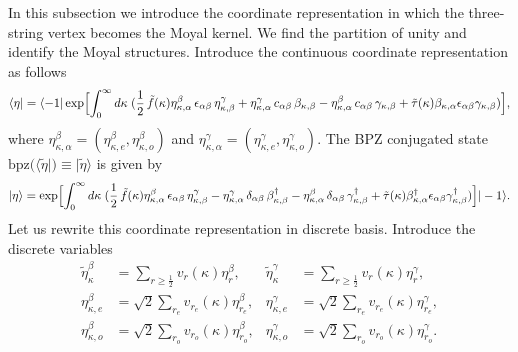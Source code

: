 \documentclass[a4paper,12pt]{article}
\begin{document}
In this subsection we introduce the coordinate
representation in which the three-string vertex
becomes the Moyal kernel.
We find the partition of unity and identify
the Moyal structures.
Introduce the continuous coordinate representation as follows
\begin{gather}
\langle \eta|=\langle-1|
\exp\Bigl[\int_{0}^{\infty}d\kappa\;
(\frac12\,\tilde{f}(\kappa)\eta^{\beta}_{\kappa,\alpha}
\,\epsilon_{\alpha\beta}\,\eta^{\gamma}_{\kappa,\beta}
+\eta^{\gamma}_{\kappa,\alpha}
\,c_{\alpha\beta}\,\beta_{\kappa,\beta}
-\eta^{\beta}_{\kappa,\alpha}
\,c_{\alpha\beta}\,\gamma_{\kappa,\beta}
+\tilde{\tau}(\kappa)
\beta_{\kappa,\alpha}\epsilon_{\alpha\beta}
\gamma_{\kappa,\beta})\Bigr],
\end{gather}
where $\eta^{\beta}_{\kappa,\alpha}
=(\eta^{\beta}_{\kappa,e},\eta^{\beta}_{\kappa,o})$
and $\eta^{\gamma}_{\kappa,\alpha}
=(\eta^{\gamma}_{\kappa,e},\eta^{\gamma}_{\kappa,o})$.
The BPZ conjugated state
$\text{bpz}(\langle\tilde{\eta}|)\equiv|\tilde{\eta}\rangle$ is given by
\begin{gather}
|\eta\rangle=
\exp\Bigl[\int_{0}^{\infty}d\kappa\;
(\frac12\,\tilde{f}(\kappa)\eta^{\beta}_{\kappa,\alpha}
\,\epsilon_{\alpha\beta}\,\eta^{\gamma}_{\kappa,\beta}
-\eta^{\gamma}_{\kappa,\alpha}
\,\delta_{\alpha\beta}\,\beta^{\dag}_{\kappa,\beta}
-\eta^{\beta}_{\kappa,\alpha}
\,\delta_{\alpha\beta}\,\gamma^{\dag}_{\kappa,\beta}
+\tilde{\tau}(\kappa)
\beta^{\dag}_{\kappa,\alpha}\epsilon_{\alpha\beta}
\gamma^{\dag}_{\kappa,\beta})\Bigr]|-1\rangle.
\label{coor-repr-right-betagamma}
\end{gather}
Let us rewrite this coordinate representation
in discrete basis.
Introduce the discrete variables
\begin{subequations}
\begin{align}
\tilde{\eta}^{\beta}_{\kappa}&=\sum_{r\geq\tfrac12}v_{r}(\kappa)\eta^{\beta}_{r},
&\tilde{\eta}^{\gamma}_{\kappa}&=\sum_{r\geq\tfrac12}v_{r}(\kappa)\eta^{\gamma}_{r},\\
\eta^{\beta}_{\kappa,e}&
=\sqrt{2}\sum_{r_e}v_{r_e}(\kappa)\eta^{\beta}_{r_e},
&\eta^{\gamma}_{\kappa,e}&
=\sqrt{2}\sum_{r_e}v_{r_e}(\kappa)\eta^{\gamma}_{r_e},\\
\eta^{\beta}_{\kappa,o}&
=\sqrt{2}\sum_{r_o}v_{r_o}(\kappa)\eta^{\beta}_{r_o},
&\eta^{\gamma}_{\kappa,o}&
=\sqrt{2}\sum_{r_o}v_{r_o}(\kappa)\eta^{\gamma}_{r_o}.
\end{align}
\end{subequations}
\end{document}

